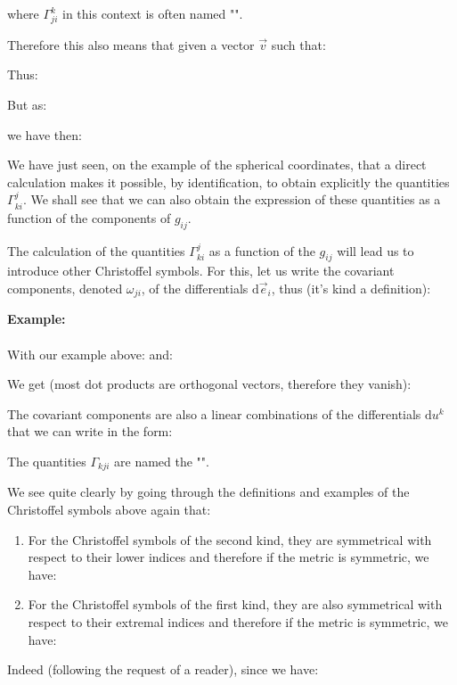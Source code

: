 	where $\Gamma_{ji}^k$ in this context is often named "".
	\begin{tcolorbox}[title=Remark,colframe=black,arc=10pt]
	Therefore this also means that given a vector $\vec{v}$ such that:
	
	Thus:
	
	But as:
	
	we have then:
	
	\end{tcolorbox}
	We have just seen, on the example of the spherical coordinates, that a direct calculation makes it possible, by identification, to obtain explicitly the quantities $\Gamma_{ki}^j$. We shall see that we can also obtain the expression of these quantities as a function of the components of $g_{ij}$.
	
	The calculation of the quantities $\Gamma_{ki}^j$ as a function of the $g_{ij}$ will lead us to introduce other Christoffel symbols. For this, let us write the covariant components, denoted $\omega_{ji}$, of the differentials $\mathrm{d}\vec{e}_i$, thus (it's kind a definition):
	
	\begin{tcolorbox}[colframe=black,colback=white,sharp corners]
	\textbf{{\Large {}}Example:}\\\\
	With our example above:
	and:
	
	We get (most dot products are orthogonal vectors, therefore they vanish):
	
	\end{tcolorbox}
	The covariant components are also a linear combinations of the  differentials $\mathrm{d}u^k$ that we can write in the form:
	
	The quantities $\Gamma_{kji}$ are named the "\label{christoffel symbols of the first kind}".

	We see quite clearly by going through the definitions and examples of the Christoffel symbols above again that:
\begin{enumerate}
	\item For the Christoffel symbols of the second kind, they are symmetrical with respect to their lower indices and therefore if the metric is symmetric, we have:
	
	
	\item For the Christoffel symbols of the first kind, they are also symmetrical with respect to their extremal indices and therefore if the metric is symmetric, we have:
	
	\end{enumerate}
	Indeed (following the request of a reader), since we have:
	
